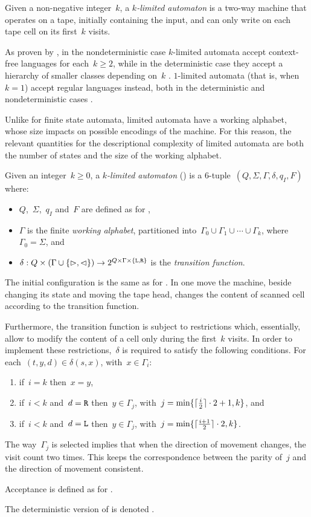 Given a non-negative integer~$k$, a \emph{$k$-limited automaton} is a two-way machine that operates on a tape, initially containing the input, and can only write on each tape cell on its first~$k$ visits.

As proven by \citeauthor{Hib67}, in the nondeterministic case $k$-limited automata accept context-free languages for each~$k\ge2$, while in the deterministic case they accept a hierarchy of smaller classes depending on~$k$ \cite{Hib67}.
$1$-limited automata (that is, when~$k=1$) accept regular languages instead, both in the deterministic and nondeterministic cases \cite{WagWec86}.

Unlike for finite state automata, limited automata have a working alphabet, whose size impacts on possible encodings of the machine.
For this reason, the relevant quantities for the descriptional complexity of limited automata are both the number of states and the size of the working alphabet.

\begin{defn}\label{def:kla}
	Given an integer~$k\ge0$, a \emph{$k$-limited automaton} (\kLA) is a 6-tuple~$(Q,\Sigma,\Gamma,\delta,q_I,F)$ where:
	\begin{itemize}
		\item $Q$,~$\Sigma$,~$q_I$ and~$F$ are defined as for \TNFAs,
		\item $\Gamma$ is the finite \emph{working alphabet}, partitioned into~$\Gamma_0\cup\Gamma_1\cup\cdots\cup\Gamma_k$, where~$\Gamma_0=\Sigma$, and
		\item $\delta:Q\times(\Gamma\cup\{\rhd,\lhd\})\to2^{Q\times\Gamma\times\{\mathtt L,\mathtt R\}}$ is the \emph{transition function}.
	\end{itemize}
	The initial configuration is the same as for \TNFAs.
	In one move the machine, beside changing its state and moving the tape head, changes the content of scanned cell according to the transition function.

	Furthermore, the transition function is subject to restrictions which, essentially, allow to modify the content of a cell only during the first~$k$ visits.
	In order to implement these restrictions,~$\delta$ is required to satisfy the following conditions. For each~$(t,y,d)\in\delta(s,x)$, with~$x\in\Gamma_i$:
	\begin{enumerate}[(1)]
		\item if~$i=k$ then~$x=y$,
		\item if~$i<k$ and~$d=\mathtt R$ then~$y\in\Gamma_j$, with~$j=\min\{\lceil \frac{i}{2} \rceil\cdot 2+1,k\}$, and
		\item if~$i<k$ and~$d=\mathtt L$ then~$y\in\Gamma_j$, with~$j=\min\{\lceil \frac{i+1}{2} \rceil\cdot 2,k\}$.
	\end{enumerate}
	The way~$\Gamma_j$ is selected implies that when the direction of movement changes, the visit count two times.
	This keeps the correspondence between the parity of~$j$ and the direction of movement consistent.

	\noindent Acceptance is defined as for \TNFAs.

	\noindent The deterministic version of \kLAs is denoted \kDLAs.
\end{defn}


